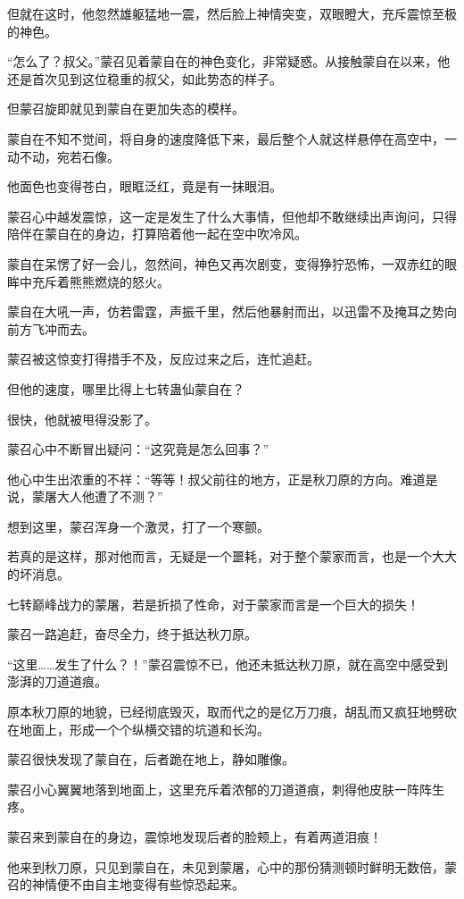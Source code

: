\begin{this_body}
但就在这时，他忽然雄躯猛地一震，然后脸上神情突变，双眼瞪大，充斥震惊至极的神色。

“怎么了？叔父。”蒙召见着蒙自在的神色变化，非常疑惑。从接触蒙自在以来，他还是首次见到这位稳重的叔父，如此势态的样子。

但蒙召旋即就见到蒙自在更加失态的模样。

蒙自在不知不觉间，将自身的速度降低下来，最后整个人就这样悬停在高空中，一动不动，宛若石像。

他面色也变得苍白，眼眶泛红，竟是有一抹眼泪。

蒙召心中越发震惊，这一定是发生了什么大事情，但他却不敢继续出声询问，只得陪伴在蒙自在的身边，打算陪着他一起在空中吹冷风。

蒙自在呆愣了好一会儿，忽然间，神色又再次剧变，变得狰狞恐怖，一双赤红的眼眸中充斥着熊熊燃烧的怒火。

蒙自在大吼一声，仿若雷霆，声振千里，然后他暴射而出，以迅雷不及掩耳之势向前方飞冲而去。

蒙召被这惊变打得措手不及，反应过来之后，连忙追赶。

但他的速度，哪里比得上七转蛊仙蒙自在？

很快，他就被甩得没影了。

蒙召心中不断冒出疑问：“这究竟是怎么回事？”

他心中生出浓重的不祥：“等等！叔父前往的地方，正是秋刀原的方向。难道是说，蒙屠大人他遭了不测？”

想到这里，蒙召浑身一个激灵，打了一个寒颤。

若真的是这样，那对他而言，无疑是一个噩耗，对于整个蒙家而言，也是一个大大的坏消息。

七转巅峰战力的蒙屠，若是折损了性命，对于蒙家而言是一个巨大的损失！

蒙召一路追赶，奋尽全力，终于抵达秋刀原。

“这里……发生了什么？！”蒙召震惊不已，他还未抵达秋刀原，就在高空中感受到澎湃的刀道道痕。

原本秋刀原的地貌，已经彻底毁灭，取而代之的是亿万刀痕，胡乱而又疯狂地劈砍在地面上，形成一个个纵横交错的坑道和长沟。

蒙召很快发现了蒙自在，后者跪在地上，静如雕像。

蒙召小心翼翼地落到地面上，这里充斥着浓郁的刀道道痕，刺得他皮肤一阵阵生疼。

蒙召来到蒙自在的身边，震惊地发现后者的脸颊上，有着两道泪痕！

他来到秋刀原，只见到蒙自在，未见到蒙屠，心中的那份猜测顿时鲜明无数倍，蒙召的神情便不由自主地变得有些惊恐起来。


\end{this_body}
